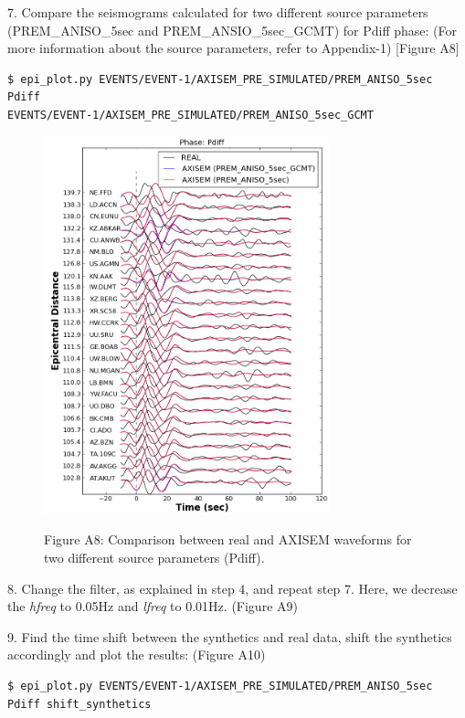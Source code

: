 \documentclass{article}
\begin{document}
7. Compare the seismograms calculated for two different source parameters (PREM\_ANISO\_5sec 
and PREM\_ANSIO\_5sec\_GCMT) for Pdiff phase: (For more information about the source 
parameters, refer to Appendix-1) [Figure A8]

\begin{lstlisting}
$ epi_plot.py EVENTS/EVENT-1/AXISEM_PRE_SIMULATED/PREM_ANISO_5sec Pdiff 
EVENTS/EVENT-1/AXISEM_PRE_SIMULATED/PREM_ANISO_5sec_GCMT
\end{lstlisting}

\begin{figure}
\centering
\includegraphics[width=234pt, height=310pt, keepaspectratio=true]{AXISEMTutorial-fig014.png}
\begin{center}
{\small{}Figure A8: Comparison between real and AXISEM waveforms for two different 
source parameters (Pdiff).}
\end{center}
\end{figure}

8. Change the filter, as explained in step 4, and repeat step 7. Here, we decrease 
the \textit{hfreq} to 0.05Hz and \textit{lfreq} to 0.01Hz. (Figure A9)

9. Find the time shift between the synthetics and real data, shift the synthetics 
accordingly and plot the results: (Figure A10)

\begin{lstlisting}
$ epi_plot.py EVENTS/EVENT-1/AXISEM_PRE_SIMULATED/PREM_ANISO_5sec Pdiff shift_synthetics
\end{lstlisting}
\end{document}
